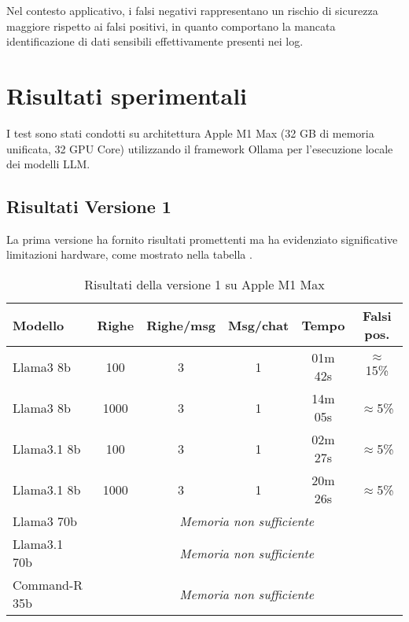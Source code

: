 \documentclass[12pt]{report}
\begin{document}
Nel contesto applicativo, i falsi negativi rappresentano un rischio di sicurezza maggiore rispetto ai falsi positivi, in quanto comportano la mancata identificazione di dati sensibili effettivamente presenti nei log.

\section{Risultati sperimentali}
\label{sec:risultati_sperimentali}

I test sono stati condotti su architettura Apple M1 Max (32 GB di memoria unificata, 32 GPU Core) utilizzando il framework Ollama per l'esecuzione locale dei modelli LLM.

\subsection{Risultati Versione 1}
\label{subsec:risultati_v1}

La prima versione ha fornito risultati promettenti ma ha evidenziato significative limitazioni hardware, come mostrato nella tabella .

\begin{table}[h!]
    \centering
    \begin{tabular}{|l|c|c|c|c|c|}
        \hline
        \textbf{Modello} & \textbf{Righe}                                        & \textbf{Righe/msg} & \textbf{Msg/chat} & \textbf{Tempo} & \textbf{Falsi pos.} \\ \hline
        Llama3 8b        & 100                                                   & 3                  & 1                 & 01m 42s        & $\approx$15\%       \\ \hline
        Llama3 8b        & 1000                                                  & 3                  & 1                 & 14m 05s        & $\approx$5\%        \\ \hline
        Llama3.1 8b      & 100                                                   & 3                  & 1                 & 02m 27s        & $\approx$5\%        \\ \hline
        Llama3.1 8b      & 1000                                                  & 3                  & 1                 & 20m 26s        & $\approx$5\%        \\ \hline
        Llama3 70b       & \multicolumn{5}{c|}{\textit{Memoria non sufficiente}}                                                                                 \\ \hline
        Llama3.1 70b     & \multicolumn{5}{c|}{\textit{Memoria non sufficiente}}                                                                                 \\ \hline
        Command-R 35b    & \multicolumn{5}{c|}{\textit{Memoria non sufficiente}}                                                                                 \\ \hline
    \end{tabular}
    \caption{Risultati della versione 1 su Apple M1 Max}
    \label{tab:risultati_v1}
\end{table}
\end{document}
